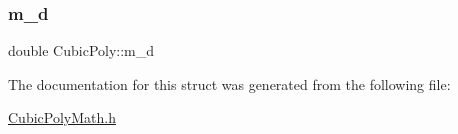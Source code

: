 \subsubsection{\texorpdfstring{m\+\_\+d}{m\_d}}
{\footnotesize\ttfamily double Cubic\+Poly\+::m\+\_\+d\hspace{0.3cm}{\ttfamily [private]}}



The documentation for this struct was generated from the following file\+:\begin{DoxyCompactItemize}
\item 
\hyperlink{CubicPolyMath_8h}{Cubic\+Poly\+Math.\+h}\end{DoxyCompactItemize}
